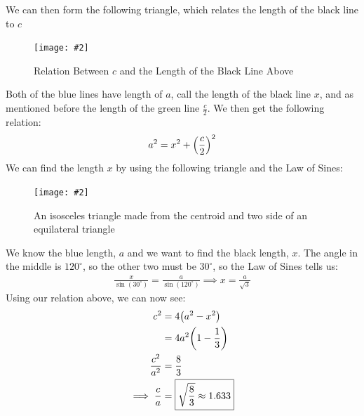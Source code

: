 \documentclass[12pt]{article}
\newcommand{\fig}[3]{
  \begin{figure}[H]
    \centering\texttt{[image: \#2]}\caption{#3}
  \end{figure}}
\begin{document}
We can then form the following triangle, which relates the length of the black line to $c$

\fig{6.0}{hcp3.png}{Relation Between $c$ and the Length of the Black Line Above}

Both of the blue lines have length of $a$, call the length of the black line $x$, and as mentioned before the length of the green line $\frac{c}{2}$. We then get the following relation:
\begin{align*}
  a^2=x^2+\qty(\frac{c}{2})^2
\end{align*}
We can find the length $x$ by using the following triangle and the Law of Sines:

\fig{6.0}{hcp4.png}{An isosceles triangle made from the centroid and two side of an equilateral triangle}

We know the blue length, $a$ and we want to find the black length, $x$. The angle in the middle is $120^\circ$, so the other two must be $30^\circ$, so the Law of Sines tells us:
\begin{align*}
  \frac{x}{\sin(30^\circ)}=\frac{a}{\sin(120^\circ)}\implies x=\frac{a}{\sqrt{3}}
\end{align*}
Using our relation above, we can now see:
\begin{align*}
  c^2&=4\qty(a^2-x^2)\\
  &=4a^2\qty(1-\frac{1}{3})\\
  \frac{c^2}{a^2}&=\frac{8}{3}\\
  \implies\frac{c}{a}&=\boxed{\sqrt{\frac{8}{3}}\approx 1.633}
\end{align*}
\end{document}
